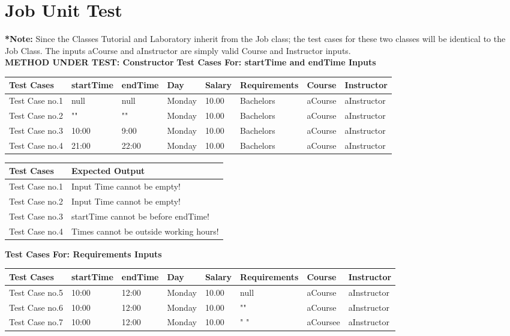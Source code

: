 \documentclass[12pt]{report}
\begin{document}
\section{Job Unit Test}
	\textbf{*Note:} Since the Classes Tutorial and Laboratory inherit from the Job class; the test cases for these two classes will be identical to the Job Class. The inputs aCourse and aInstructor are simply valid Course and Instructor inputs. \\
	\textbf{METHOD UNDER TEST: Constructor} \newline
	\textbf{Test Cases For: startTime and endTime Inputs}
	\begin{flushleft}
		\begin{tabular}{ | l | l | l | l | l | l | l | l | }
			\hline
			Test Cases & startTime & endTime & Day & Salary & Requirements & Course & Instructor \\ \hline
			Test Case no.1 & null & null & Monday & 10.00 & Bachelors & aCourse & aInstructor \\ \hline
			Test Case no.2 & "" & "" & Monday & 10.00 & Bachelors & aCourse & aInstructor \\ \hline
			Test Case no.3 & 10:00 & 9:00 & Monday & 10.00 & Bachelors & aCourse & aInstructor \\ \hline
			Test Case no.4 & 21:00 & 22:00 & Monday & 10.00 & Bachelors & aCourse & aInstructor \\ \hline
		\end{tabular}
	\end{flushleft}
	
	\begin{flushleft}
		\begin{tabular}{ | l | l | }
			\hline
			Test Cases & Expected Output \\ \hline
			Test Case no.1 & Input Time cannot be empty! \\ \hline
			Test Case no.2 & Input Time cannot be empty! \\ \hline
			Test Case no.3 & startTime cannot be before endTime! \\ \hline
			Test Case no.4 & Times cannot be outside working hours! \\ \hline
		\end{tabular}
	\end{flushleft}

	\textbf{Test Cases For: Requirements Inputs}
	\begin{flushleft}
		\begin{tabular}{ | l | l | l | l | l | l | l | l | }
			\hline
			Test Cases & startTime & endTime & Day & Salary & Requirements & Course & Instructor \\ \hline
			Test Case no.5 & 10:00 & 12:00 & Monday & 10.00 & null & aCourse & aInstructor \\ \hline
			Test Case no.6 & 10:00 & 12:00 & Monday & 10.00 & "" & aCourse & aInstructor \\ \hline
			Test Case no.7 & 10:00 & 12:00 & Monday & 10.00 & " " & aCoursee & aInstructor \\ \hline
		\end{tabular}
	\end{flushleft}
	
\end{document}
